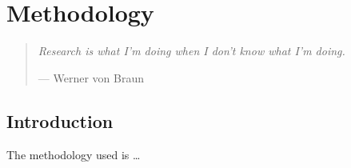 %
%
%
%

\chapter{Methodology}\label{C.methodology}

\begin{quote}
\textit{Research is what I'm doing when I don't know what I'm doing.} 

--- Werner von Braun
\end{quote}

\section{Introduction}\label{S.intro4}

The methodology used is \ldots
